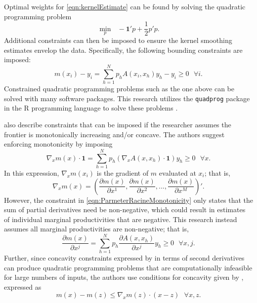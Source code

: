 \documentclass[twocolumn]{article}
\begin{document}
Optimal weights for \cref{eqn:kernelEstimate} can be found by solving the quadratic programming problem
\begin{equation}
	\min_p \mbox{\ \ }-\mathbf{1}'p + \frac12 p'p.
\end{equation}
Additional constraints can then be imposed to ensure the kernel smoothing estimates envelop the data. Specifically, the following bounding constraints are imposed:
\begin{equation}
	m(x_i) - y_i = \sum_{h=1}^N p_h A(x_i, x_h) y_h - y_i \geq 0 \mbox{\ \ \ \ }\forall i.
\end{equation}
Constrained quadratic programming problems such as the one above can be solved with many software packages. This research utilizes the \texttt{quadprog} package in the R programming language to solve these problems \citep{quadprog}.

\cite{ParmeterRacine} also describe constraints that can be imposed if the researcher assumes the frontier is monotonically increasing and/or concave. The authors suggest enforcing monotonicity by imposing
\begin{equation}
	\label{eqn:ParmeterRacineMonotonicity}
	\nabla_x m(x)\cdot \mathbf{1} = \sum_{h=1}^N p_h \left(\nabla_x A(x, x_h)\cdot \mathbf{1}\right)y_h \geq 0 \mbox{\ \ \ \ }\forall x.
\end{equation}
In this expression, $\nabla_x m(x_i)$ is the gradient of $m$ evaluated at $x_i$; that is,
\begin{equation}
	\nabla_x m(x) = \left(\frac{\partial m(x)}{\partial x^1}, \frac{\partial m(x)}{\partial x^2}, ..., \frac{\partial m(x)}{\partial x^M}\right)'.
\end{equation}
However, the constraint in \cref{eqn:ParmeterRacineMonotonicity} only states that the sum of partial derivatives need be non-negative, which could result in estimates of individual marginal productivities that are negative. This research instead assumes all marginal productivities are non-negative; that is,
\begin{equation}
	\label{eqn:monotonicity}
	\frac{\partial m(x)}{\partial x^j} = \sum_{h=1}^N p_h \frac{\partial A(x, x_h)}{\partial x^j} y_h \geq 0 \mbox{\ \ \ \ }\forall x, j.
\end{equation}
Further, since concavity constraints expressed by in terms of second derivatives can produce quadratic programming problems that are computationally infeasible for large numbers of inputs, the authors use conditions for concavity given by \cite{Afriat}, expressed as
\begin{equation}
	\label{eqn:concavity}
	m(x) - m(z) \leq \nabla_x m(z) \cdot (x - z) \mbox{\ \ \ \ }\forall x, z.
\end{equation}
\end{document}
